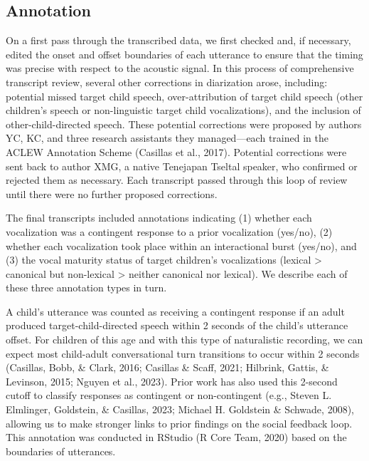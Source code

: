 \documentclass[
  man]{apa6}
\begin{document}
\hypertarget{annotation}{%
\subsection{Annotation}\label{annotation}}

On a first pass through the transcribed data, we first checked and, if necessary, edited the onset and offset boundaries of each utterance to ensure that the timing was precise with respect to the acoustic signal. In this process of comprehensive transcript review, several other corrections in diarization arose, including: potential missed target child speech, over-attribution of target child speech (other children's speech or non-linguistic target child vocalizations), and the inclusion of other-child-directed speech. These potential corrections were proposed by authors YC, KC, and three research assistants they managed---each trained in the ACLEW Annotation Scheme (Casillas et al., 2017). Potential corrections were sent back to author XMG, a native Tenejapan Tseltal speaker, who confirmed or rejected them as necessary. Each transcript passed through this loop of review until there were no further proposed corrections.

The final transcripts included annotations indicating (1) whether each vocalization was a contingent response to a prior vocalization (yes/no), (2) whether each vocalization took place within an interactional burst (yes/no), and (3) the vocal maturity status of target children's vocalizations (lexical \textgreater{} canonical but non-lexical \textgreater{} neither canonical nor lexical). We describe each of these three annotation types in turn.

A child's utterance was counted as receiving a contingent response if an adult produced target-child-directed speech within 2 seconds of the child's utterance offset. For children of this age and with this type of naturalistic recording, we can expect most child-adult conversational turn transitions to occur within 2 seconds (Casillas, Bobb, \& Clark, 2016; Casillas \& Scaff, 2021; Hilbrink, Gattis, \& Levinson, 2015; Nguyen et al., 2023). Prior work has also used this 2-second cutoff to classify responses as contingent or non-contingent (e.g., Steven L. Elmlinger, Goldstein, \& Casillas, 2023; Michael H. Goldstein \& Schwade, 2008), allowing us to make stronger links to prior findings on the social feedback loop. This annotation was conducted in RStudio (R Core Team, 2020) based on the boundaries of utterances.
\end{document}
